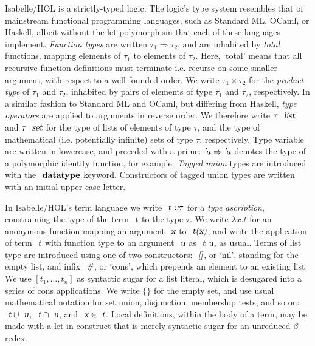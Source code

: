 \documentclass[acmlarge,review,anonymous]{acmart}\settopmatter{printfolios=true}
\begin{document}
Isabelle/HOL is a strictly-typed logic.
The logic's type system resembles that of mainstream functional programming languages, such as Standard ML, OCaml, or Haskell, albeit without the let-polymorphism that each of these languages implement.
\emph{Function types} are written $\tau_1 \Rightarrow \tau_2$, and are inhabited by \emph{total} functions, mapping elements of $\tau_1$ to elements of $\tau_2$.
Here, `total' means that all recursive function definitions must terminate i.e. recurse on some smaller argument, with respect to a well-founded order.
We write $\tau_1 \times \tau_2$ for the \emph{product type} of $\tau_1$ and $\tau_2$, inhabited by pairs of elements of type $\tau_1$ and $\tau_2$, respectively.
In a similar fashion to Standard ML and OCaml, but differing from Haskell, \emph{type operators} are applied to arguments in reverse order.
We therefore write $\tau\ \isa{list}$ and $\tau\ \isa{set}$ for the type of lists of elements of type $\tau$, and the type of mathematical (i.e. potentially infinite) sets of type $\tau$, respectively.
Type variable are written in lowercase, and preceded with a prime: ${\emph{$\mskip2mu{'}\mskip-2mu$}}a \Rightarrow {\emph{$\mskip2mu{'}\mskip-2mu$}}a$ denotes the type of a polymorphic identity function, for example.
\emph{Tagged union} types are introduced with the $\isacommand{datatype}$ keyword.
Constructors of tagged union types are written with an initial upper case letter.

In Isabelle/HOL's term language we write $\isa{t} \isa{::} \tau$ for a \emph{type ascription}, constraining the type of the term $\isa{t}$ to the type $\tau$.
We write $\lambda{x}. t$ for an anonymous function mapping an argument $\isa{x}$ to $\isa{t(x)}$, and write the application of term $\isa{t}$ with function type to an argument $\isa{u}$ as $\isa{t\ u}$, as usual.
Terms of list type are introduced using one of two constructors: $\isa{[]}$, or `nil', standing for the empty list, and infix $\isa{\#}$, or `cons', which prepends an element to an existing list.
We use $[t_1, \ldots, t_n]$ as syntactic sugar for a list literal, which is desugared into a series of cons applications.
We write $\{\}$ for the empty set, and use usual mathematical notation for set union, disjunction, membership tests, and so on: $\isa{t} \cup \isa{u}$, $\isa{t} \cap \isa{u}$, and $\isa{x} \in \isa{t}$.
Local definitions, within the body of a term, may be made with a let-in construct that is merely syntactic sugar for an unreduced $\beta$-redex.
\end{document}
